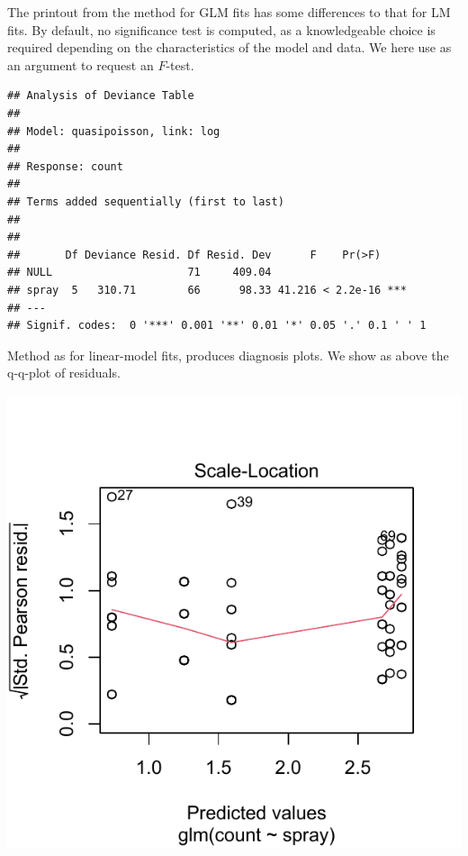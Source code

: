\documentclass[krantz2]{krantz}\usepackage{knitr}
\begin{document}
The printout from the  method for GLM fits has some differences to that for LM fits. By default, no significance test is computed, as a knowledgeable choice is required depending on the characteristics of the model and data. We here use  as an argument to request an $F$-test.

\begin{knitrout}\footnotesize
{}\color{fgcolor}\begin{kframe}
\begin{alltt}
  \hlstd{=} \hlstd{)}
\end{alltt}
\begin{verbatim}
## Analysis of Deviance Table
## 
## Model: quasipoisson, link: log
## 
## Response: count
## 
## Terms added sequentially (first to last)
## 
## 
##       Df Deviance Resid. Df Resid. Dev      F    Pr(>F)    
## NULL                     71     409.04                     
## spray  5   310.71        66      98.33 41.216 < 2.2e-16 ***
## ---
## Signif. codes:  0 '***' 0.001 '**' 0.01 '*' 0.05 '.' 0.1 ' ' 1
\end{verbatim}
\end{kframe}
\end{knitrout}

Method  as for linear-model fits, produces diagnosis plots. We show as above the q-q-plot of residuals.

\begin{knitrout}\footnotesize
{}\color{fgcolor}\begin{kframe}
\begin{alltt}
  \hlstd{=} \hlstd{)}
\end{alltt}
\end{kframe}

{\centering \includegraphics[width=.54\textwidth]{figure/pos-model-11-1} 

}


\end{knitrout}
\end{document}
